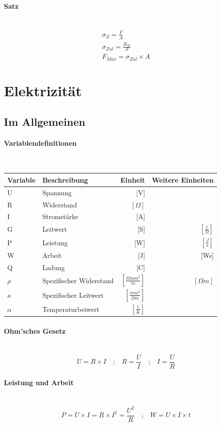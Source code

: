 \documentclass[a4paper,10pt]{article}
\newcommand{\lbparagraph}[1]{\paragraph{#1}\mbox{}\\}
\newcommand{\eqsp}[1]{\quad\textbf{;}\quad}
\begin{document}
\lbparagraph{Satz}

\begin{gather}
    {\sigma}_Z = \frac{F}{A} \\
    {\sigma}_{Zul} = \frac{R_M}{S} \\
    F_{Max} = {\sigma}_{Zul} \times A
\end{gather}

\section{Elektrizität}

\subsection{Im Allgemeinen}

\lbparagraph{Variablendefinitionen}

\begin{tabular}{l|l|r|r}
    Variable & Beschreibung & Einheit & Weitere Einheiten \\
    \hline
    U & Spannung & [V] & \\
    R & Widerstand & $[\Omega]$ & \\
    I & Stromstärke & [A] & \\
    G & Leitwert & [S] & $[\frac{1}{\Omega}]$ \\
    P & Leistung & [W] & $[\frac{J}{s}]$ \\
    W & Arbeit & [J] & [Ws] \\
    Q & Ladung & [C] & \\
    $\rho$ & Spezifischer Widerstand & $[\frac{{\Omega}mm^2}{m}]$ & $[{\Omega}m]$ \\
    $\kappa$ & Spezifischer Leitwert & $[\frac{mm^2}{{\Omega}m}]$ & \\
    $\alpha$ & Temperaturbeiwert & $[\frac{1}{K}]$ &
\end{tabular}

\lbparagraph{Ohm'sches Gesetz}

\begin{equation}
    U = R \times I
    \eqsp{}
    R = \frac{U}{I}
    \eqsp{}
    I = \frac{U}{R}
\end{equation}

\lbparagraph{Leistung und Arbeit}

\begin{equation}
    P = U \times I = R \times I^2 = \frac{U^2}{R}
    \eqsp{}
    W = U \times I \times t
\end{equation}
\end{document}
